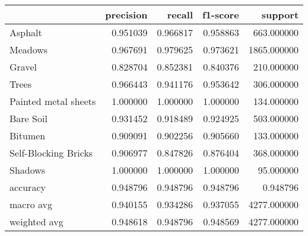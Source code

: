 \begin{tabular}{lrrrr}
\toprule
{} &  precision &    recall &  f1-score &      support \\
\midrule
Asphalt              &   0.951039 &  0.966817 &  0.958863 &   663.000000 \\
Meadows              &   0.967691 &  0.979625 &  0.973621 &  1865.000000 \\
Gravel               &   0.828704 &  0.852381 &  0.840376 &   210.000000 \\
Trees                &   0.966443 &  0.941176 &  0.953642 &   306.000000 \\
Painted metal sheets &   1.000000 &  1.000000 &  1.000000 &   134.000000 \\
Bare Soil            &   0.931452 &  0.918489 &  0.924925 &   503.000000 \\
Bitumen              &   0.909091 &  0.902256 &  0.905660 &   133.000000 \\
Self-Blocking Bricks &   0.906977 &  0.847826 &  0.876404 &   368.000000 \\
Shadows              &   1.000000 &  1.000000 &  1.000000 &    95.000000 \\
accuracy             &   0.948796 &  0.948796 &  0.948796 &     0.948796 \\
macro avg            &   0.940155 &  0.934286 &  0.937055 &  4277.000000 \\
weighted avg         &   0.948618 &  0.948796 &  0.948569 &  4277.000000 \\
\bottomrule
\end{tabular}
